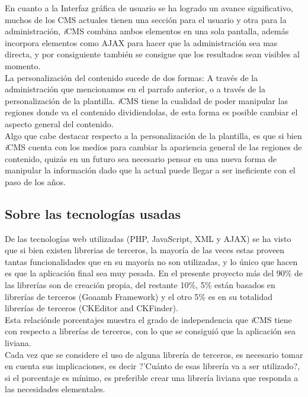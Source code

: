 En cuanto a la Interfaz gr\'afica de usuario se ha logrado un avance significativo, muchos de los CMS actuales tienen una secci\'on para el usuario y otra para la administraci\'on, \textit{i}CMS combina ambos elementos en una sola pantalla, adem\'as incorpora elementos como AJAX para hacer que la administraci\'on sea mas directa, y por consiguiente tambi\'en se consigue que los resultados sean visibles al momento.\\

La personalizaci\'on del contenido sucede de dos formas: A trav\'es de la administraci\'on que mencionamos en el parrafo anterior, o a trav\'es de la personalizaci\'on de la plantilla. \textit{i}CMS tiene la cualidad de poder manipular las regiones donde va el contenido dividiendolas, de esta forma es posible cambiar el aspecto general del contenido.\\

Algo que cabe destacar respecto a la personalizaci\'on de la plantilla, es que si bien \textit{i}CMS cuenta con los medios para cambiar la apariencia general de las regiones de contenido, quiz\'as en un futuro sea necesario pensar en una nueva forma de manipular la informaci\'on dado que la actual puede llegar a ser ineficiente con el paso de los a\~nos.\\

\subsection{Sobre las tecnolog\'ias usadas}
De las tecnolog\'ias web utilizadas (PHP, JavaScript, XML y AJAX) se ha visto que si bien existen librerias de terceros, la mayor\'ia de las veces estas proveen tantas funcionalidades que en su mayor\'ia no son utilizadas, y lo \'unico que hacen es que la aplicaci\'on final sea muy pesada. En el presente proyecto m\'as del 90\% de las librer\'ias son de creaci\'on propia, del restante 10\%, 5\% est\'an basados en librer\'ias de terceros (Goaamb Framework) y el otro 5\% es en su totalidad librer\'ias de terceros (CKEditor and CKFinder).\\

Esta relaci\'onde porcentajes muestra el grado de independencia que \textit{i}CMS tiene con respecto a librer\'ias de terceros, con lo que se consigui\'o que la aplicaci\'on sea liviana.\\

Cada vez que se considere el uso de alguna librer\'ia de terceros, es necesario tomar en cuenta sus implicaciones, es decir ?'Cu\'anto de esas librer\'ia va a ser utilizado?, si el porcentaje es m\'inimo, es preferible crear una librer\'ia liviana que responda a las necesidades elementales.\\

